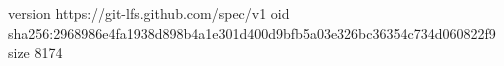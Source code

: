 version https://git-lfs.github.com/spec/v1
oid sha256:2968986e4fa1938d898b4a1e301d400d9bfb5a03e326bc36354c734d060822f9
size 8174
